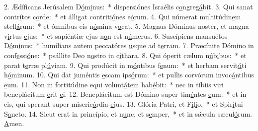 2. Ædíficans Jerúsalem D\uline{ó}m\uline{i}nus:~* dispersiónes Israélis c\uline{o}ngreg\uline{á}bit.
3. Qui sanat contr\uline{í}tos c\uline{o}rde:~* et álligat contriti\uline{ó}nes e\uline{ó}rum.
4. Qui númerat multitúdin\uline{e}m stell\uline{á}rum:~* et ómnibus eis n\uline{ó}mina v\uline{o}cat.
5. Magnus Dóminus noster, et magna v\uline{i}rtus \uline{e}jus:~* et sapiéntiæ ejus n\uline{o}n est n\uline{ú}merus.
6. Suscípiens mansuétos D\uline{ó}m\uline{i}nus:~* humílians autem peccatóres \uline{u}sque ad t\uline{e}rram.
7. Præcínite Dómino in conf\uline{e}ssi\uline{ó}ne:~* psállite Deo n\uline{o}stro in c\uline{í}thara.
8. Qui óperit cælum n\uline{ú}b\uline{i}bus:~* et parat t\uline{e}rræ pl\uline{ú}viam.
9. Qui prodúcit in m\uline{ó}ntibus f\uline{e}num:~* et herbam servit\uline{ú}ti h\uline{ó}minum.
10. Qui dat juméntis \uline{e}scam ips\uline{ó}rum:~* et pullis corvórum invoc\uline{á}ntibus \uline{e}um.
11. Non in fortitúdine equi volunt\uline{á}tem hab\uline{é}bit:~* nec in tíbiis viri beneplácitum \uline{e}rit \uline{e}i.
12. Beneplácitum est Dómino super tim\uline{é}ntes \uline{e}um:~* et in eis, qui sperant super miseric\uline{ó}rdia \uline{e}jus.
13. Glória Patri, et F\uline{í}l\uline{i}o,~* et Spir\uline{í}tui S\uline{a}ncto.
14. Sicut erat in princípio, et n\uline{u}nc, et s\uline{e}mper,~* et in sǽcula sæcul\uline{ó}rum. \uline{A}men.
